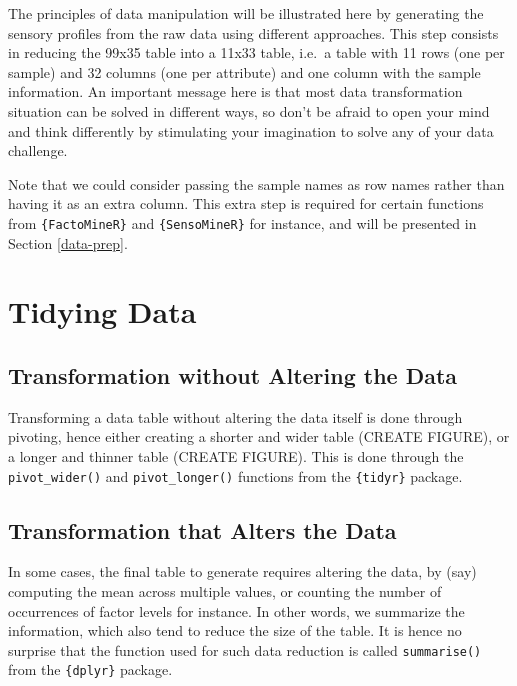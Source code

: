 \documentclass[
]{book}
\begin{document}
The principles of data manipulation will be illustrated here by generating the sensory profiles from the raw data using different approaches. This step consists in reducing the 99x35 table into a 11x33 table, i.e.~a table with 11 rows (one per sample) and 32 columns (one per attribute) and one column with the sample information. An important message here is that most data transformation situation can be solved in different ways, so don't be afraid to open your mind and think differently by stimulating your imagination to solve any of your data challenge.

Note that we could consider passing the sample names as row names rather than having it as an extra column. This extra step is required for certain functions from \texttt{\{FactoMineR\}} and \texttt{\{SensoMineR\}} for instance, and will be presented in Section \ref{data-prep}.

\hypertarget{tidying-data}{%
\section{Tidying Data}\label{tidying-data}}

\hypertarget{transformation-without-altering-the-data}{%
\subsection{Transformation without Altering the Data}\label{transformation-without-altering-the-data}}

Transforming a data table without altering the data itself is done through pivoting, hence either creating a shorter and wider table (CREATE FIGURE), or a longer and thinner table (CREATE FIGURE). This is done through the \texttt{pivot\_wider()} and \texttt{pivot\_longer()} functions from the \texttt{\{tidyr\}} package.

\hypertarget{transformation-that-alters-the-data}{%
\subsection{Transformation that Alters the Data}\label{transformation-that-alters-the-data}}

In some cases, the final table to generate requires altering the data, by (say) computing the mean across multiple values, or counting the number of occurrences of factor levels for instance. In other words, we summarize the information, which also tend to reduce the size of the table. It is hence no surprise that the function used for such data reduction is called \texttt{summarise()} from the \texttt{\{dplyr\}} package.
\end{document}
